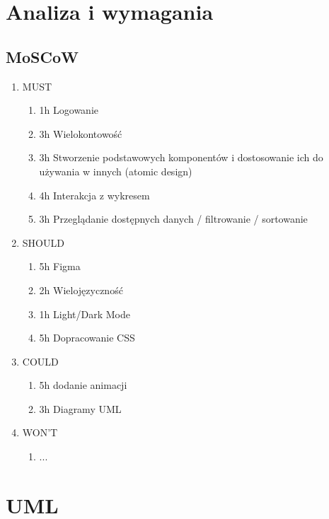 \documentclass[a4paper,11pt]{article}
\begin{document}
\maketitle

\section{Analiza i wymagania}
\subsection{MoSCoW}


\begin{enumerate}
    \item MUST
    \begin{enumerate}
        \item 1h Logowanie
        \item 3h Wielokontowość
        \item 3h Stworzenie podstawowych komponentów i dostosowanie ich do używania w innych (atomic design)
        \item 4h Interakcja z wykresem
        \item 3h Przeglądanie dostępnych danych / filtrowanie / sortowanie
    \end{enumerate}
    \item SHOULD
    \begin{enumerate}
        \item 5h Figma
        \item 2h Wielojęzyczność
        \item 1h Light/Dark Mode
        \item 5h Dopracowanie CSS
    \end{enumerate}
    \item COULD
    \begin{enumerate}
        \item 5h dodanie animacji
        \item 3h Diagramy UML  
    \end{enumerate}
    \item WON'T
    \begin{enumerate}
        \item ...
        
    \end{enumerate}
\end{enumerate}
\section{UML}
\end{document}
